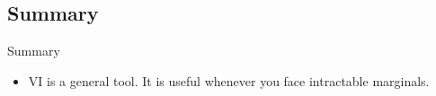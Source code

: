 \documentclass[10pt]{beamer}
\begin{document}
%
%
%

\subsection{Summary}

\begin{frame}{Summary}

\begin{itemize}
\item VI is a general tool.  It is useful whenever you face intractable marginals.
\end{itemize}


\end{frame}
\end{document}

